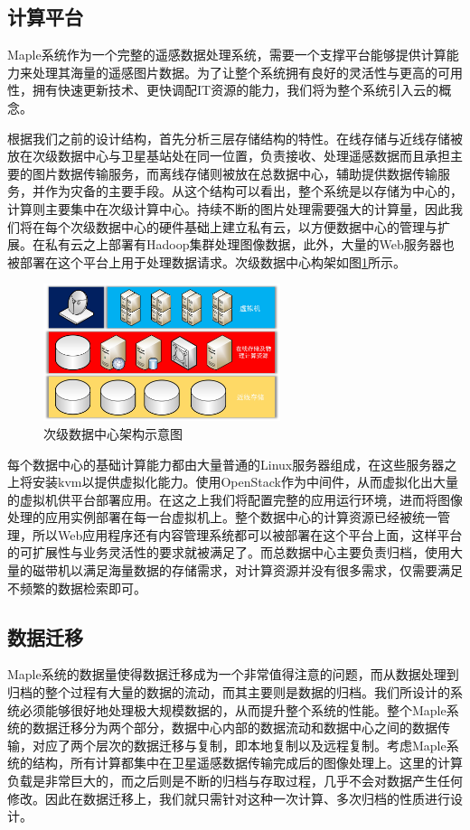 \documentclass{article}
\begin{document}
\subsection{计算平台}

Maple系统作为一个完整的遥感数据处理系统，需要一个支撑平台能够提供计算能力来处理其海量的遥感图片数据。为了让整个系统拥有良好的灵活性与更高的可用性，拥有快速更新技术、更快调配IT资源的能力，我们将为整个系统引入云的概念。

根据我们之前的设计结构，首先分析三层存储结构的特性。在线存储与近线存储被放在次级数据中心与卫星基站处在同一位置，负责接收、处理遥感数据而且承担主要的图片数据传输服务，而离线存储则被放在总数据中心，辅助提供数据传输服务，并作为灾备的主要手段。从这个结构可以看出，整个系统是以存储为中心的，计算则主要集中在次级计算中心。持续不断的图片处理需要强大的计算量，因此我们将在每个次级数据中心的硬件基础上建立私有云，以方便数据中心的管理与扩展。在私有云之上部署有Hadoop集群处理图像数据，此外，大量的Web服务器也被部署在这个平台上用于处理数据请求。次级数据中心构架如图\ref{sub}所示。

\begin{figure}[H]
\centering 
\includegraphics[width=0.618\textwidth]{pic/sub.jpg}
\caption{次级数据中心架构示意图}
\label{sub}
\end{figure}

每个数据中心的基础计算能力都由大量普通的Linux服务器组成，在这些服务器之上将安装kvm以提供虚拟化能力。使用OpenStack作为中间件，从而虚拟化出大量的虚拟机供平台部署应用。在这之上我们将配置完整的应用运行环境，进而将图像处理的应用实例部署在每一台虚拟机上。整个数据中心的计算资源已经被统一管理，所以Web应用程序还有内容管理系统都可以被部署在这个平台上面，这样平台的可扩展性与业务灵活性的要求就被满足了。而总数据中心主要负责归档，使用大量的磁带机以满足海量数据的存储需求，对计算资源并没有很多需求，仅需要满足不频繁的数据检索即可。

\subsection{数据迁移}
Maple系统的数据量使得数据迁移成为一个非常值得注意的问题，而从数据处理到归档的整个过程有大量的数据的流动，而其主要则是数据的归档。我们所设计的系统必须能够很好地处理极大规模数据的，从而提升整个系统的性能。整个Maple系统的数据迁移分为两个部分，数据中心内部的数据流动和数据中心之间的数据传输，对应了两个层次的数据迁移与复制，即本地复制以及远程复制。考虑Maple系统的结构，所有计算都集中在卫星遥感数据传输完成后的图像处理上。这里的计算负载是非常巨大的，而之后则是不断的归档与存取过程，几乎不会对数据产生任何修改。因此在数据迁移上，我们就只需针对这种一次计算、多次归档的性质进行设计。
\end{document}
